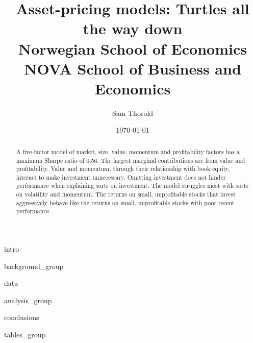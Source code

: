 \documentclass[a4paper, 12pt]{article}
\title{
  {Asset-pricing models: Turtles all the way down}\\
  {\large Norwegian School of Economics}\\
  {\large NOVA School of Business and Economics}
}
\author{Sam Thorold}
\date{\today}
\begin{document}

\begin{abstract}
  A five-factor model of
  market, size, value, momentum and profitability factors
  has a maximum Sharpe ratio of 0.56.
  The largest marginal contributions are from value and profitability.
  Value and momentum, through their relationship with book equity,
  interact to make investment unnecessary.
  Omitting investment does not hinder performance when explaining sorts on investment.
  The model struggles most with sorts on volatility and momentum.
  The returns on small, unprofitable stocks that invest aggressively behave
  like the returns on small, unprofitable stocks with poor recent performance.
\end{abstract}

{intro}

{background_group}

{data}

{analysis_group}

{conclusions}


\printbibliography


\appendix

{tables_group}

\end{document}
